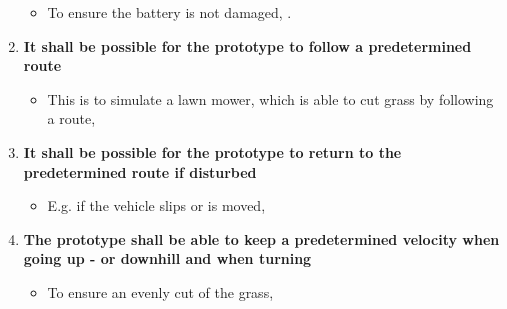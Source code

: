 \begin{enumerate}
	\begin{itemize}
	\item[] To ensure the battery is not damaged, .
	\end{itemize}
\item \textbf{It shall be possible for the prototype to follow a predetermined route}
	\begin{itemize}
	\item[] This is to simulate a lawn mower, which is able to cut grass by following a route, 
	\end{itemize}
\item \textbf{It shall be possible for the prototype to return to the predetermined route if disturbed}
	\begin{itemize}
	\item[] E.g. if the vehicle slips or is moved, 
	\end{itemize}
\item \textbf{The prototype shall be able to keep a predetermined velocity when going up - or downhill and when turning}
	\begin{itemize}
	\item[] To ensure an evenly cut of the grass, 
	\end{itemize}
\end{enumerate}
